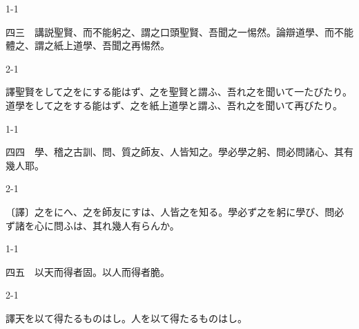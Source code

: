 \documentclass[tate,paper=b6j,jafontsize=9pt]{jlreq}
\begin{document}
\begin{azconvIndented}{1\zw}{-1\zw}

四三　講説聖賢、而不能躬之、謂之口頭聖賢、吾聞之一惕然。論辯道學、而不能體之、謂之紙上道學、吾聞之再惕然。

\end{azconvIndented}
\begin{azconvIndented}{2\zw}{-1\zw}

譯聖賢をして之をにする能はず、之を聖賢と謂ふ、吾れ之を聞いて一たびたり。道學をして之をする能はず、之を紙上道學と謂ふ、吾れ之を聞いて再びたり。

\end{azconvIndented}

\begin{azconvIndented}{1\zw}{-1\zw}

四四　學、稽之古訓、問、質之師友、人皆知之。學必學之躬、問必問諸心、其有幾人耶。

\end{azconvIndented}
\begin{azconvIndented}{2\zw}{-1\zw}

〔譯〕之をにへ、之を師友にすは、人皆之を知る。學必ず之を躬に學び、問必ず諸を心に問ふは、其れ幾人有らんか。

\end{azconvIndented}

\begin{azconvIndented}{1\zw}{-1\zw}

四五　以天而得者固。以人而得者脆。

\end{azconvIndented}
\begin{azconvIndented}{2\zw}{-1\zw}

譯天を以て得たるものはし。人を以て得たるものはし。

\end{azconvIndented}
\end{document}
